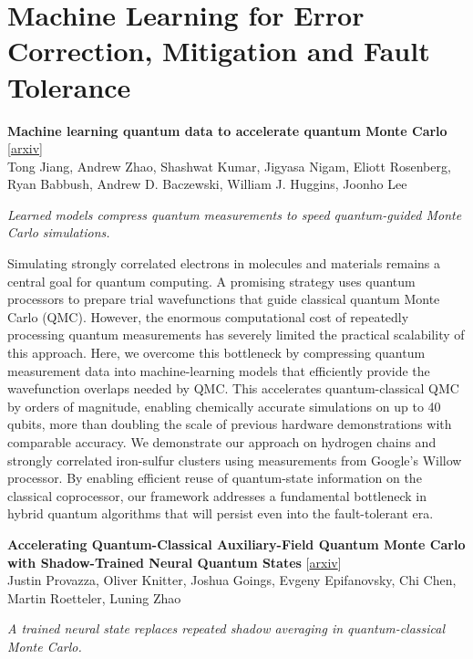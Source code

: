 \documentclass[12pt,letterpaper]{article}
\begin{document}
\section*{Machine Learning for Error Correction, Mitigation and Fault Tolerance}
{\small\textbf{Machine learning quantum data to accelerate quantum Monte Carlo}} {\scriptsize[\href{https://arxiv.org/abs/2611.08151}{arxiv}]}\nopagebreak\\
{\scriptsize Tong Jiang, Andrew Zhao, Shashwat Kumar, Jigyasa Nigam, Eliott Rosenberg, Ryan Babbush, Andrew D. Baczewski, William J. Huggins, Joonho Lee}\nopagebreak\\[2pt]
{\footnotesize\textit{Learned models compress quantum measurements to speed quantum-guided Monte Carlo simulations.}\par}\nopagebreak
{\footnotesize Simulating strongly correlated electrons in molecules and materials remains a central goal for quantum computing. A promising strategy uses quantum processors to prepare trial wavefunctions that guide classical quantum Monte Carlo (QMC). However, the enormous computational cost of repeatedly processing quantum measurements has severely limited the practical scalability of this approach. Here, we overcome this bottleneck by compressing quantum measurement data into machine-learning models that efficiently provide the wavefunction overlaps needed by QMC. This accelerates quantum-classical QMC by orders of magnitude, enabling chemically accurate simulations on up to 40 qubits, more than doubling the scale of previous hardware demonstrations with comparable accuracy. We demonstrate our approach on hydrogen chains and strongly correlated iron-sulfur clusters using measurements from Google's Willow processor. By enabling efficient reuse of quantum-state information on the classical coprocessor, our framework addresses a fundamental bottleneck in hybrid quantum algorithms that will persist even into the fault-tolerant era.\par}
\medskip
{\small\textbf{Accelerating Quantum-Classical Auxiliary-Field Quantum Monte Carlo with Shadow-Trained Neural Quantum States}} {\scriptsize[\href{https://arxiv.org/abs/2611.08129}{arxiv}]}\nopagebreak\\
{\scriptsize Justin Provazza, Oliver Knitter, Joshua Goings, Evgeny Epifanovsky, Chi Chen, Martin Roetteler, Luning Zhao}\nopagebreak\\[2pt]
{\footnotesize\textit{A trained neural state replaces repeated shadow averaging in quantum-classical Monte Carlo.}\par}\nopagebreak
\end{document}
